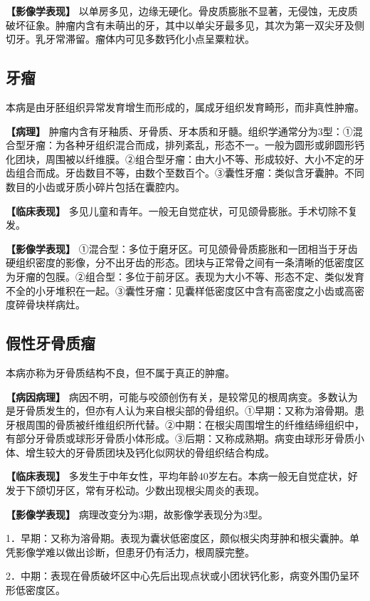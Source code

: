 \textbf{【影像学表现】}
以单房多见，边缘无硬化。骨皮质膨胀不显著，无侵蚀，无皮质破坏征象。肿瘤内含有未萌出的牙，其中以单尖牙最多见，其次为第一双尖牙及侧切牙。乳牙常滞留。瘤体内可见多数钙化小点呈粟粒状。

\subsection{牙瘤}

本病是由牙胚组织异常发育增生而形成的，属成牙组织发育畸形，而非真性肿瘤。

\textbf{【病理】}
肿瘤内含有牙釉质、牙骨质、牙本质和牙髓。组织学通常分为3型：①混合型牙瘤：为各种牙组织混合而成，排列紊乱，形态不一。一般为圆形或卵圆形钙化团块，周围被以纤维膜。②组合型牙瘤：由大小不等、形成较好、大小不定的牙齿组合而成。牙齿数目不等，由数个至数百个。③囊性牙瘤：类似含牙囊肿。不同数目的小齿或牙质小碎片包括在囊腔内。

\textbf{【临床表现】}
多见儿童和青年。一般无自觉症状，可见颌骨膨胀。手术切除不复发。

\textbf{【影像学表现】}
①混合型：多位于磨牙区。可见颌骨骨质膨胀和一团相当于牙齿硬组织密度的影像，分不出牙齿的形态。团块与正常骨之间有一条清晰的低密度区为牙瘤的包膜。②组合型：多位于前牙区。表现为大小不等、形态不定、类似发育不全的小牙堆积在一起。③囊性牙瘤：见囊样低密度区中含有高密度之小齿或高密度碎骨块样病灶。

\subsection{假性牙骨质瘤}

本病亦称为牙骨质结构不良，但不属于真正的肿瘤。

\textbf{【病因病理】}
病因不明，可能与咬颌创伤有关，是较常见的根周病变。多数认为是牙骨质发生的，但亦有人认为来自根尖部的骨组织。①早期：又称为溶骨期。患牙根周围的骨质被纤维组织所代替。②中期：在根尖周围增生的纤维结缔组织中，有部分牙骨质或球形牙骨质小体形成。③后期：又称成熟期。病变由球形牙骨质小体、增生较大的牙骨质团块及钙化似网状的骨组织结合构成。

\textbf{【临床表现】}
多发生于中年女性，平均年龄40岁左右。本病一般无自觉症状，好发于下颌切牙区，常有牙松动。少数出现根尖周炎的表现。

\textbf{【影像学表现】} 病理改变分为3期，故影像学表现分为3型。

1．早期：又称为溶骨期。表现为囊状低密度区，颇似根尖肉芽肿和根尖囊肿。单凭影像学难以做出诊断，但患牙仍有活力，根周膜完整。

2．中期：表现在骨质破坏区中心先后出现点状或小团状钙化影，病变外围仍呈环形低密度区。

